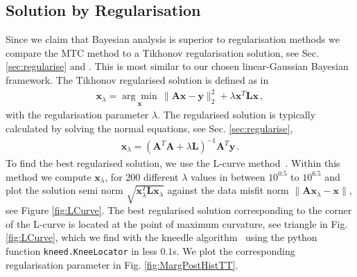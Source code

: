 \subsection{Solution by Regularisation}
\label{sec:reg}
Since we claim that Bayesian analysis is superior to regularisation methods we compare the MTC method to a Tikhonov regularisation solution, see Sec. \ref{sec:regularise} and \cite{fox2016fast}.
This is most similar to our chosen linear-Gaussian Bayesian framework.
The Tikhonov regularised solution is defined as in~\cite{hansen2010discrete, fox2016fast} 
\begin{align}
	\bm{x}_{\lambda} =\underset{ \bm{x}}{\arg \min}\,  \lVert \bm{A}\bm{x} - \bm{y} \rVert_2^2 + \lambda \bm{x}^T \bm{L} \bm{x} \, ,
	\label{eq:XLam}
\end{align}
with the regularisation parameter $\lambda$.
The regularised solution is typically calculated by solving the normal equations, see Sec. \ref{sec:regularise},
\begin{align}
	\bm{x}_{\lambda} = (\bm{A}^T\bm{A} + \lambda \bm{L} )^{-1} \bm{A}^T \bm{y} \label{eq:xLam} \, .
\end{align}
To find the best regularised solution, we use the L-curve method~\cite{hansen1993use}.
Within this method we compute $\bm{x}_\lambda$, for 200 different $\lambda$ values in between $10^{0.5}$ to $10^{6.5}$ and plot the solution semi norm $\sqrt{\bm{x}_\lambda^T\mathbf{L} \bm{x}_\lambda}$ against the data misfit norm $\lVert \bm{A}\bm{x}_\lambda - \bm{x} \rVert$, see Figure \ref{fig:LCurve}. 
The best regularised solution corresponding to the corner of the L-curve is located at the point of maximum curvature, see triangle in Fig. \ref{fig:LCurve}, which we find with the kneedle algorithm~\cite{satopaa2011kneedle} using the python function \texttt{kneed.KneeLocator} in less $0.1$s.
We plot the corresponding regularisation parameter in Fig. \ref{fig:MargPostHistTT}.
